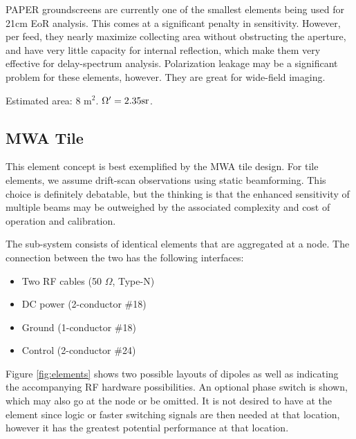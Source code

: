 \documentclass[11pt]{article}
\begin{document}
PAPER groundscreens are currently one of the smallest elements being used for 21cm EoR analysis.
This comes at a significant penalty in sensitivity.  However, per feed, they nearly maximize
collecting area without obstructing the aperture, and have very little capacity for internal
reflection, which make them very effective for delay-spectrum analysis.  Polarization leakage
may be a significant problem for these elements, however.  They are great for wide-field imaging.

Estimated area: 8 m$^2$.  $\Omega^\prime=2.35 {\rm sr}$.

\subsection{MWA Tile}

This element concept is best exemplified by the MWA tile design.
For tile elements, we assume drift-scan observations using
static beamforming.  This choice is definitely debatable, but 
the thinking is that the enhanced sensitivity of multiple beams
may be outweighed by the associated complexity and cost of operation and calibration.

The sub-system consists of identical elements that are aggregated at
a node.  The connection between the two has the following interfaces:

\begin{itemize}
\item Two RF cables (50 $\Omega$, Type-N)
\item DC power (2-conductor \#18)
\item Ground (1-conductor \#18)
\item Control (2-conductor \#24)
\end{itemize}

Figure \ref{fig:elements} shows two possible layouts of dipoles as well as
indicating the accompanying RF hardware possibilities.  An optional phase
switch is shown, which may also go at the node or be omitted.  It is not
desired to have at the element since logic or faster switching signals are then
needed at that location, however it has the greatest potential performance at
that location.
\end{document}
